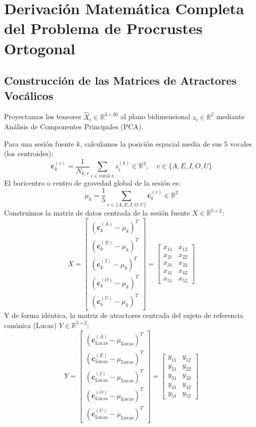 \documentclass[11pt,a4paper,openany]{book}
\theoremstyle{definition}
\begin{document}
\section{Derivación Matemática Completa del Problema de Procrustes Ortogonal}
\label{sec:procrustes_completo}

\subsection{Construcción de las Matrices de Atractores Vocálicos}
Proyectamos los tensores $\hat{X}_i \in \mathbb{R}^{3 \times 20}$ al plano bidimensional $z_i \in \mathbb{R}^2$ mediante Análisis de Componentes Principales (PCA).

Para una sesión fuente $k$, calculamos la posición espacial media de sus 5 vocales (los centroides):
$$\mathbf{c}_k^{(v)} = \frac{1}{N_{k, v}} \sum_{i \in \text{vocal } v} z_i^{(k)} \in \mathbb{R}^2, \quad v \in \{A, E, I, O, U\}$$
El baricentro o centro de gravedad global de la sesión es:
$$\mu_k = \frac{1}{5} \sum_{v \in \{A,E,I,O,U\}} \mathbf{c}_k^{(v)} \in \mathbb{R}^2$$
Construimos la matriz de datos centrada de la sesión fuente $X \in \mathbb{R}^{5 \times 2}$:
\begin{equation}
X = \begin{bmatrix} (\mathbf{c}_k^{(A)} - \mu_k)^T \\ (\mathbf{c}_k^{(E)} - \mu_k)^T \\ (\mathbf{c}_k^{(I)} - \mu_k)^T \\ (\mathbf{c}_k^{(O)} - \mu_k)^T \\ (\mathbf{c}_k^{(U)} - \mu_k)^T \end{bmatrix} = \begin{bmatrix} x_{11} & x_{12} \\ x_{21} & x_{22} \\ x_{31} & x_{32} \\ x_{41} & x_{42} \\ x_{51} & x_{52} \end{bmatrix}
\end{equation}
Y de forma idéntica, la matriz de atractores centrada del sujeto de referencia canónica (Lucas) $Y \in \mathbb{R}^{5 \times 2}$:
\begin{equation}
Y = \begin{bmatrix} (\mathbf{c}_{\text{Lucas}}^{(A)} - \mu_{\text{Lucas}})^T \\ (\mathbf{c}_{\text{Lucas}}^{(E)} - \mu_{\text{Lucas}})^T \\ (\mathbf{c}_{\text{Lucas}}^{(I)} - \mu_{\text{Lucas}})^T \\ (\mathbf{c}_{\text{Lucas}}^{(O)} - \mu_{\text{Lucas}})^T \\ (\mathbf{c}_{\text{Lucas}}^{(U)} - \mu_{\text{Lucas}})^T \end{bmatrix} = \begin{bmatrix} y_{11} & y_{12} \\ y_{21} & y_{22} \\ y_{31} & y_{32} \\ y_{41} & y_{42} \\ y_{51} & y_{52} \end{bmatrix}
\end{equation}
\end{document}
